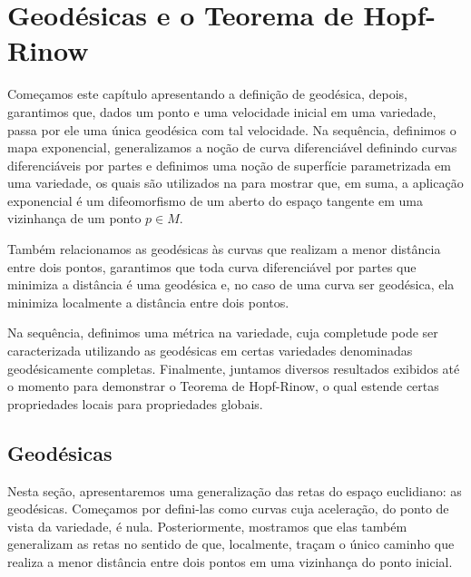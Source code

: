 
\chapter{Geodésicas e o Teorema de Hopf-Rinow}
\label{cap:geodesicas-hopf-rinow}
Começamos este capítulo apresentando a definição de geodésica, depois, garantimos que, dados um ponto e uma velocidade inicial em uma variedade, passa por ele uma única geodésica com tal velocidade.  Na sequência, definimos o mapa exponencial, generalizamos a noção de curva diferenciável definindo curvas diferenciáveis por partes e definimos uma noção de superfície parametrizada em uma variedade, os quais são utilizados na  para mostrar que, em suma, a aplicação exponencial é um difeomorfismo de um aberto do espaço tangente em uma vizinhança de um ponto $p \in M$.

Também relacionamos as geodésicas às curvas que realizam a menor distância entre dois pontos, garantimos que toda curva diferenciável por partes que minimiza a distância é uma geodésica e, no caso de uma curva ser geodésica, ela minimiza localmente a distância entre dois pontos.

Na sequência, definimos uma métrica na variedade, cuja completude pode ser caracterizada utilizando as geodésicas em certas variedades denominadas geodésicamente completas. Finalmente, juntamos diversos resultados exibidos até o momento para demonstrar o Teorema de Hopf-Rinow, o qual estende certas propriedades locais para propriedades globais.
\section{Geodésicas}
\label{sec:geodesicas}
Nesta seção, apresentaremos uma generalização das retas do espaço euclidiano: as geodésicas. Começamos por defini-las como curvas cuja aceleração, do ponto de vista da variedade, é nula. Posteriormente, mostramos que elas também generalizam as retas no sentido de que, localmente, traçam o único caminho que realiza a menor distância entre dois pontos em uma vizinhança do ponto inicial.

